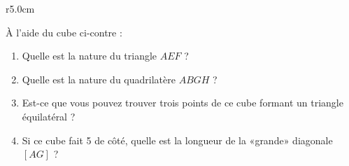 
\begin{wrapfigure}[3]{r}{5.0cm}
   \vspace{-0.5cm}        %
   \centering
   
\end{wrapfigure}

À l'aide du cube ci-contre :
\begin{enumerate}
    \item
        Quelle est la nature du triangle \( AEF\) ? 
    \item
        Quelle est la nature du quadrilatère \( ABGH\) ?
    \item
        Est-ce que vous pouvez trouver trois points de ce cube formant un triangle équilatéral ?
    \item
        Si ce cube fait \unit{5}{\meter} de côté, quelle est la longueur de la «grande» diagonale \( [AG]\) ?
\end{enumerate}

